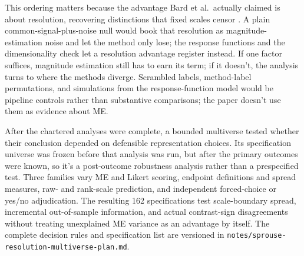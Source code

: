 This ordering matters because the advantage Bard et al.\ actually claimed is
about resolution, recovering distinctions that fixed scales censor
\citep[35]{BardEtAl1996}. A plain common-signal-plus-noise null would book
that resolution as magnitude-estimation noise and let the method only lose; the
response functions and the dimensionality check let a resolution advantage
register instead. If one factor suffices, magnitude estimation still has to earn
its term; if it doesn't, the analysis turns to where the methods diverge.
Scrambled labels, method-label permutations, and simulations from the
response-function model would be pipeline controls rather than substantive
comparisons; the paper doesn't use them as evidence about ME.

After the chartered analyses were complete, a bounded multiverse tested whether
their conclusion depended on defensible representation choices. Its
specification universe was frozen before that analysis was run, but after the
primary outcomes were known, so it's a post-outcome robustness analysis rather
than a prespecified test. Three families vary ME and Likert scoring, endpoint
definitions and spread measures, raw- and rank-scale prediction, and independent
forced-choice or yes/no adjudication. The resulting 162 specifications test
scale-boundary spread, incremental out-of-sample information, and actual
contrast-sign disagreements without treating unexplained ME variance as an
advantage by itself. The complete decision rules and specification list are
versioned in \texttt{notes/sprouse-resolution-multiverse-plan.md}.
